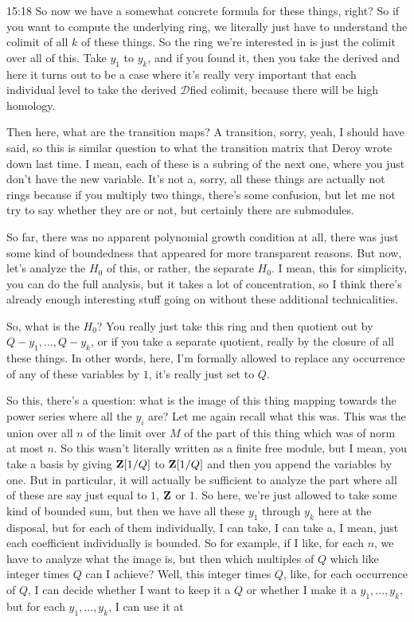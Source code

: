 \begin{unfinished}{15:18}
So now we have a somewhat concrete formula for these things, right? So if you want to compute the underlying ring, we literally just have to understand the colimit of all $k$ of these things. So the ring we're interested in is just the colimit over all of this. Take $y_1$ to $y_k$, and if you found it, then you take the derived and here it turns out to be a case where it's really very important that each individual level to take the derived $\mathcal{D}$fied colimit, because there will be high homology.

Then here, what are the transition maps? A transition, sorry, yeah, I should have said, so this is similar question to what the transition matrix that Deroy wrote down last time. I mean, each of these is a subring of the next one, where you just don't have the new variable. It's not a, sorry, all these things are actually not rings because if you multiply two things, there's some confusion, but let me not try to say whether they are or not, but certainly there are submodules.

So far, there was no apparent polynomial growth condition at all, there was just some kind of boundedness that appeared for more transparent reasons. But now, let's analyze the $H_0$ of this, or rather, the separate $H_0$. I mean, this for simplicity, you can do the full analysis, but it takes a lot of concentration, so I think there's already enough interesting stuff going on without these additional technicalities.

So, what is the $H_0$? You really just take this ring and then quotient out by $Q - y_1, \dots, Q - y_k$, or if you take a separate quotient, really by the closure of all these things. In other words, here, I'm formally allowed to replace any occurrence of any of these variables by $1$, it's really just set to $Q$.

So this, there's a question: what is the image of this thing mapping towards the power series where all the $y_i$ are? Let me again recall what this was. This was the union over all $n$ of the limit over $M$ of the part of this thing which was of norm at most $n$. So this wasn't literally written as a finite free module, but I mean, you take a basis by giving $\mathbf Z[1/Q]$ to $\mathbf Z[1/Q]$ and then you append the variables by one. But in particular, it will actually be sufficient to analyze the part where all of these are say just equal to $1$, $\mathbf Z$ or $1$. So here, we're just allowed to take some kind of bounded sum, but then we have all these $y_1$ through $y_k$ here at the disposal, but for each of them individually, I can take, I can take a, I mean, just each coefficient individually is bounded. So for example, if I like, for each $n$, we have to analyze what the image is, but then which multiples of $Q$ which like integer times $Q$ can I achieve? Well, this integer times $Q$, like, for each occurrence of $Q$, I can decide whether I want to keep it a $Q$ or whether I make it a $y_1,...,y_k$, but for each $y_1,...,y_k$, I can use it at


\end{unfinished}
